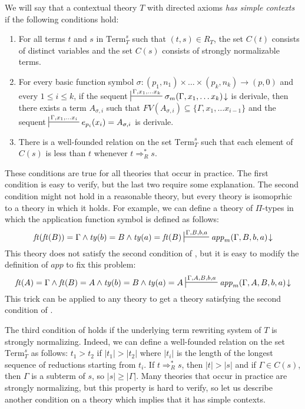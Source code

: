 \documentclass[reqno]{amsart}
\theoremstyle{definition}
\theoremstyle{remark}
\newcommand{\Term}{\mathrm{Term}}
\newcommand{\app}{\mathit{app}}
\newcommand{\ft}{\mathit{ft}}
\newcommand{\ty}{\mathit{ty}}
\numberwithin{figure}{section}
\begin{document}
\begin{defn}
We will say that a contextual theory $T$ with directed axioms \emph{has simple contexts} if the following conditions hold:
\begin{enumerate}
\item For all terms $t$ and $s$ in $\Term_T^s$ such that $(t,s) \in R_T$, the set $C(t)$ consists of distinct variables and the set $C(s)$ consists of strongly normalizable terms.
\item For every basic function symbol $\sigma : (p_1,n_1) \times \ldots \times (p_k,n_k) \to (p,0)$ and every $1 \leq i \leq k$,
if the sequent $\sststile{}{\Gamma, x_1, \ldots x_k} \sigma_m(\Gamma, x_1, \ldots x_k)\!\downarrow$ is derivale,
then there exists a term $A_{\sigma,i}$ such that $FV(A_{\sigma,i}) \subseteq \{ \Gamma, x_1, \ldots x_{i-1} \}$ and the sequent $\sststile{}{\Gamma, x_1, \ldots x_i} e_{p_i}(x_i) = A_{\sigma,i}$ is derivale.
\item There is a well-founded relation on the set $\Term_T^s$ such that each element of $C(s)$ is less than $t$ whenever $t \Rightarrow_R^* s$.
\end{enumerate}
\end{defn}
These conditions are true for all theories that occur in practice.
The first condition is easy to verify, but the last two require some explanation.
The second condition might not hold in a reasonable theory, but every theory is isomoprhic to a theory in which it holds.
For example, we can define a theory of $\Pi$-types in which the application function symbol is defined as follows:
\[ \ft(\ft(B)) = \Gamma \land \ty(b) = B \land \ty(a) = \ft(B) \sststile{}{\Gamma,B,b,a} \app_m(\Gamma,B,b,a)\!\downarrow \]
This theory does not satisfy the second condition of , but it is easy to modify the definition of $\app$ to fix this problem:
\[ \ft(A) = \Gamma \land \ft(B) = A \land \ty(b) = B \land \ty(a) = A \sststile{}{\Gamma,A,B,b,a} \app_m(\Gamma,A,B,b,a)\!\downarrow \]
This trick can be applied to any theory to get a theory satisfying the second condition of .

The third condition of  holds if the underlying term rewriting system of $T$ is strongly normalizing.
Indeed, we can define a well-founded relation on the set $\Term_T^s$ as follows: $t_1 > t_2$ if $|t_1| > |t_2|$ where $|t_i|$ is the length of the longest sequence of reductions starting from $t_i$.
If $t \Rightarrow_R^* s$, then $|t| > |s|$ and if $\Gamma \in C(s)$, then $\Gamma$ is a subterm of $s$, so $|s| \geq |\Gamma|$.
Many theories that occur in practice are strongly normalizing, but this property is hard to verify, so let us describe another condition on a theory which implies that it has simple contexts.
\end{document}
